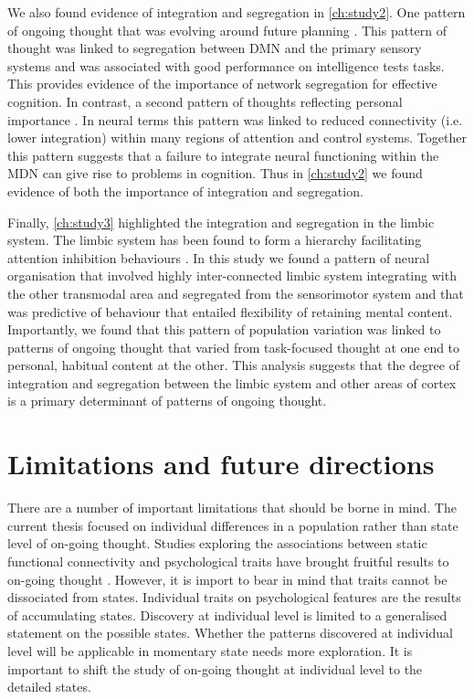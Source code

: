 We also found evidence of integration and segregation in \cref{ch:study2}. One pattern of ongoing thought that was evolving around future planning . This pattern of thought was linked to segregation between DMN and the primary sensory systems and was associated with good performance on intelligence tests tasks. This provides evidence of the importance of network segregation for effective cognition. In contrast, a second pattern of thoughts reflecting personal importance . In neural terms this pattern was linked to reduced connectivity (i.e. lower integration) within many regions of attention and control systems. Together this pattern suggests that a failure to integrate neural functioning within the MDN can give rise to problems in cognition. Thus in \cref{ch:study2} we found evidence of both the importance of integration and segregation. 

Finally, \cref{ch:study3} highlighted the integration and segregation in the limbic system. The limbic system has been found to form a hierarchy facilitating attention inhibition behaviours \cite{Kleckner2017}. In this study we found a pattern of neural organisation that involved highly inter-connected limbic system integrating with the other transmodal area and segregated from the sensorimotor system and that was predictive of behaviour that entailed flexibility of retaining mental content. Importantly, we found that this pattern of population variation was linked to patterns of ongoing thought that varied from task-focused thought at one end to personal, habitual content at the other. This analysis suggests that the degree of integration and segregation between the limbic system and other areas of cortex is a primary determinant of patterns of ongoing thought.


\section{Limitations and future directions}

There are a number of important limitations that should be borne in mind. The current thesis focused on individual differences in a population rather than state level of on-going thought. Studies exploring the associations between static functional connectivity and psychological traits have brought fruitful results to on-going thought \cite{Smallwood2016,McVay2009,RubyPlos2013}. However, it is import to bear in mind that traits cannot be dissociated from states. Individual traits on psychological features are the results of accumulating states. Discovery at individual level is limited to a generalised statement on the possible states. Whether the patterns discovered at individual level will be applicable in momentary state needs more exploration. It is important to shift the study of on-going thought at individual level to the detailed states. 

